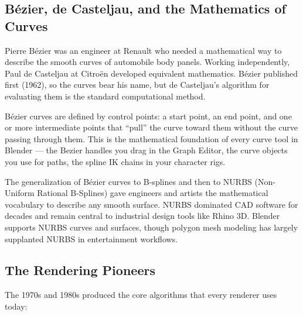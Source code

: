 \documentclass[11pt,letterpaper,twoside,openright]{book}
\begin{document}
\subsection{B\'{e}zier, de Casteljau, and the Mathematics of Curves}

Pierre B\'{e}zier was an engineer at Renault who needed a mathematical way to describe the smooth curves of automobile body panels. Working independently, Paul de Casteljau at Citro\"{e}n developed equivalent mathematics. B\'{e}zier published first (1962), so the curves bear his name, but de Casteljau's algorithm for evaluating them is the standard computational method.

B\'{e}zier curves are defined by control points: a start point, an end point, and one or more intermediate points that ``pull'' the curve toward them without the curve passing through them. This is the mathematical foundation of every curve tool in Blender --- the Bezier handles you drag in the Graph Editor, the curve objects you use for paths, the spline IK chains in your character rigs.

The generalization of B\'{e}zier curves to B-splines and then to NURBS (Non-Uniform Rational B-Splines) gave engineers and artists the mathematical vocabulary to describe any smooth surface. NURBS dominated CAD software for decades and remain central to industrial design tools like Rhino 3D. Blender supports NURBS curves and surfaces, though polygon mesh modeling has largely supplanted NURBS in entertainment workflows.

\subsection{The Rendering Pioneers}

The 1970s and 1980s produced the core algorithms that every renderer uses today:
\end{document}
